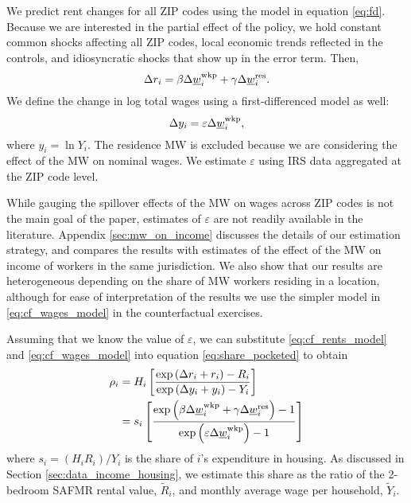 We predict rent changes for all ZIP codes using the model in equation 
\eqref{eq:fd}.
Because we are interested in the partial effect of the policy, we hold constant 
common shocks affecting all ZIP codes,
local economic trends reflected in the controls, and
idiosyncratic shocks that show up in the error term.
Then,
\begin{equation}\label{eq:cf_rents_model}
    \Delta r_i = \beta \Delta \underline{w}_i^{\text{wkp}} + \gamma \Delta \underline{w}_i^{\text{res}} .
\end{equation}
We define the change in log total wages using a first-differenced model as well:
\begin{equation}\label{eq:cf_wages_model}
    \Delta y_i = \varepsilon \Delta \underline{w}_i^{\text{wkp}} ,
\end{equation}
where $y_i=\ln Y_i$.
The residence MW is excluded because we are considering the effect of the MW on 
nominal wages.
We estimate $\varepsilon$ using IRS data aggregated at the ZIP code level.

While gauging the spillover effects of the MW on wages across ZIP codes is 
not the main goal of the paper, estimates of $\varepsilon$ are not readily 
available in the literature.
Appendix \ref{sec:mw_on_income} discusses the details of our estimation 
strategy, and compares the results with estimates of the effect of the MW 
on income of workers in the same jurisdiction.
We also show that our results are heterogeneous depending on the share of 
MW workers residing in a location, although for ease of interpretation of the
results we use the simpler model in \eqref{eq:cf_wages_model} in the 
counterfactual exercises.

Assuming that we know the value of $\varepsilon$, we can substitute
\eqref{eq:cf_rents_model} and \eqref{eq:cf_wages_model} into equation
\eqref{eq:share_pocketed} to obtain
\begin{equation*}\label{eq:rho}
    \begin{split}
        \rho_i & = H_i \left[ 
        \frac{\exp \left(\Delta r_i + r_i \right) - R_i }
             {\exp \left(\Delta y_i + y_i \right) - Y_i }
        \right] \\
        & = s_i \left[
            \frac{\exp \left( \beta \Delta \underline{w}_i^{\text{wkp}} + \gamma \Delta \underline{w}_i^{\text{res}} \right) - 1 }
                {\exp \left( \varepsilon \Delta \underline{w}_i^{\text{wkp}} \right) - 1 }
            \right]
    \end{split}
\end{equation*}
where $s_i = \left(H_i R_i\right)/Y_i$ is the share of $i$'s expenditure in 
housing.
As discussed in Section \ref{sec:data_income_housing},
we estimate this share as the ratio of the 2-bedroom SAFMR rental value, 
$\tilde R_i$, and monthly average wage per household, $\tilde Y_i$.

